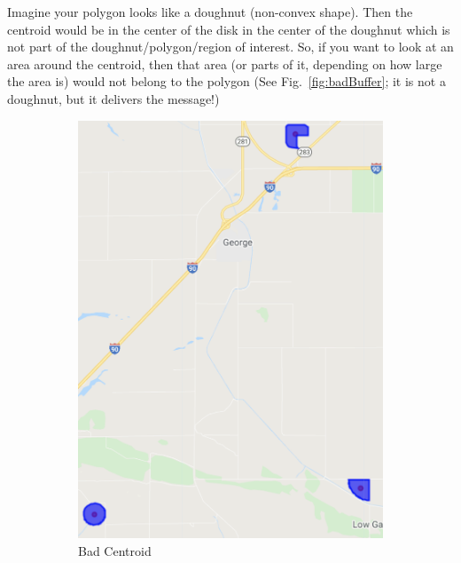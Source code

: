 \documentclass{article}
\begin{document}
{\color{red}{Warning:}} 
Imagine your polygon looks like a doughnut (non-convex shape).
Then the centroid would be in the center 
of the disk in the center
of the doughnut which is not part of the doughnut/polygon/region of interest.
So, if you want to look at an area around 
the centroid, then
that area (or parts of it, depending on how large the area is) 
would not belong to the polygon 
(See Fig.~\ref{fig:badBuffer}; it is not a doughnut, 
but it delivers the message!)
\begin{figure}[!h]
  \centering
  \begin{subfigure}[b]{0.4\textwidth}
    \includegraphics[width=1.1\textwidth]{figures/badCentroid}
    \caption{Bad Centroid}
    \label{fig:badCentroid}
  \end{subfigure}
  \qquad 
  \begin{subfigure}[b]{.4\textwidth}

\end{subfigure}
\end{figure}
\end{document}
